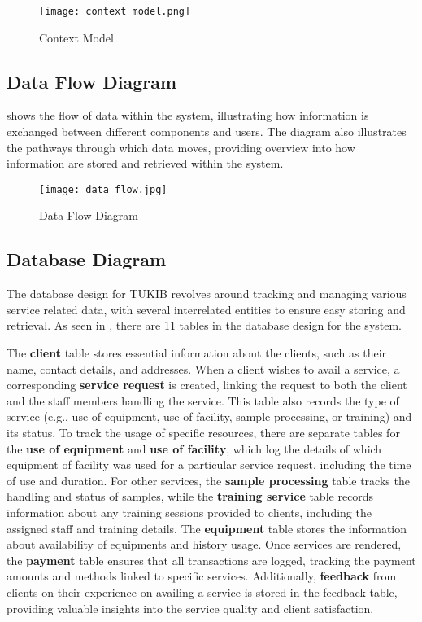 \begin{figure}[h]
	\centering 
	\texttt{[image: context model.png]}
	\caption{Context Model}
	\label{fig:context_model}
\end{figure}

\newpage

\subsection{Data Flow Diagram}

 shows the flow of data within the system, illustrating how information is exchanged between different components and users. The diagram also illustrates the pathways through which data moves, providing overview into how information are stored and retrieved within the system.

\begin{figure}[h]
	\centering 
	\texttt{[image: data\_flow.jpg]}
	\caption{Data Flow Diagram}
	\label{fig:data_flow}
\end{figure}

\newpage

\subsection{Database Diagram}

The database design for TUKIB revolves around tracking and managing various service related data, with several interrelated entities to ensure easy storing and retrieval. As seen in , there are 11 tables in the database design for the system. 

The \textbf{client} table stores essential information about the clients, such as their name, contact details, and addresses. When a client wishes to avail a service, a corresponding \textbf{service request} is created, linking the request to both the client and the staff members handling the service. This table also records the type of service (e.g., use of equipment, use of facility, sample processing, or training) and its status. To track the usage of specific resources, there are separate tables for the \textbf{use of equipment} and \textbf{use of facility}, which log the details of which equipment of facility was used for a particular service request, including the time of use and duration. For other services, the \textbf{sample processing} table tracks the handling and status of samples, while the \textbf{training service} table records information about any training sessions provided to clients, including the assigned staff and training details. The \textbf{equipment} table stores the information about availability of equipments and history usage. Once services are rendered, the \textbf{payment} table ensures that all transactions are logged, tracking the payment amounts and methods linked to specific services. Additionally, \textbf{feedback} from clients on their experience on availing a service is stored in the feedback table, providing valuable insights into the service quality and client satisfaction.

